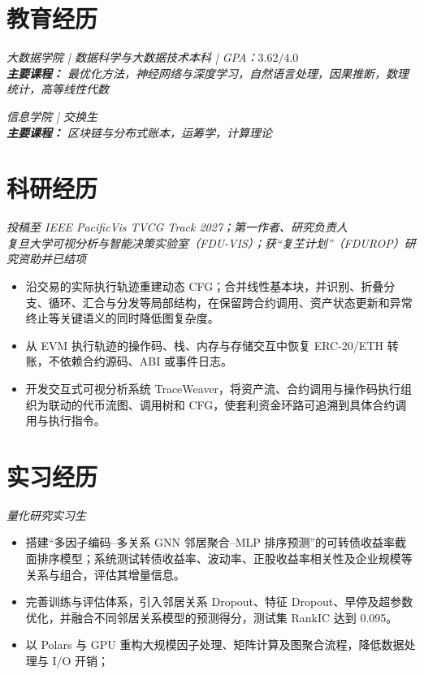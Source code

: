 \documentclass{resume}
\begin{document}



\section{教育经历}

\textit{大数据学院 \quad | \quad 数据科学与大数据技术本科 \quad | \quad GPA：$3.62/4.0$}\\
\textit{\textbf{主要课程：} 最优化方法，神经网络与深度学习，自然语言处理，因果推断，数理统计，高等线性代数}

\textit{信息学院 \quad | \quad 交换生}\\
\textit{\textbf{主要课程：} 区块链与分布式账本，运筹学，计算理论}

\section{科研经历}
\textit{投稿至 IEEE PacificVis TVCG Track 2027；第一作者、研究负责人}\\
\textit{复旦大学可视分析与智能决策实验室（FDU-VIS）；获“复芏计划”（FDUROP）研究资助并已结项}
\begin{itemize}[parsep=0.2ex]
    \item 沿交易的实际执行轨迹重建动态 CFG；合并线性基本块，并识别、折叠分支、循环、汇合与分发等局部结构，在保留跨合约调用、资产状态更新和异常终止等关键语义的同时降低图复杂度。
    \item 从 EVM 执行轨迹的操作码、栈、内存与存储交互中恢复 ERC-20/ETH 转账，不依赖合约源码、ABI 或事件日志。
    \item 开发交互式可视分析系统 TraceWeaver，将资产流、合约调用与操作码执行组织为联动的代币流图、调用树和 CFG，使套利资金环路可追溯到具体合约调用与执行指令。
\end{itemize}


\section{实习经历}
\textit{量化研究实习生}
\begin{itemize}[parsep=0.2ex]
  \item 搭建“多因子编码--多关系 GNN 邻居聚合--MLP 排序预测”的可转债收益率截面排序模型；系统测试转债收益率、波动率、正股收益率相关性及企业规模等关系与组合，评估其增量信息。
  \item 完善训练与评估体系，引入邻居关系 Dropout、特征 Dropout、早停及超参数优化，并融合不同邻居关系模型的预测得分，测试集 RankIC 达到 0.095。
  \item 以 Polars 与 GPU 重构大规模因子处理、矩阵计算及图聚合流程，降低数据处理与 I/O 开销；
\end{itemize}
\end{document}
